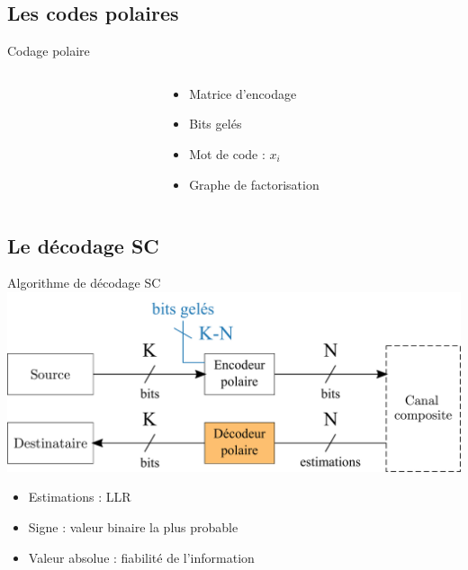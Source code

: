 \documentclass[t,compress,mathserif,12pt,xcolor=dvipsnames]{beamer}
\begin{document}
\subsection*{Les codes polaires}
\begin{frame}[c]{Codage polaire}
	\begin{columns}[T] %
		\begin{column}{.65\textwidth}
		\end{column}
		\begin{column}{.35\textwidth}
		\begin{itemize}
			\item<1-> Matrice d'encodage
			\item<2-> Bits gelés
			\item<3-> Mot de code : $x_i$
			\item<4-> Graphe de factorisation
		\end{itemize}
		\end{column}

	\end{columns}

\end{frame}
\subsection*{Le décodage SC}

\begin{frame}[c]{Algorithme de décodage SC}
	\includegraphics[width=.8\textwidth]{fig/decoder_in_chain.pdf}
	\begin{itemize}
		\item Estimations : LLR
		\item Signe : valeur binaire la plus probable
		\item Valeur absolue : fiabilité de l'information
	\end{itemize}
\end{frame}
\end{document}
